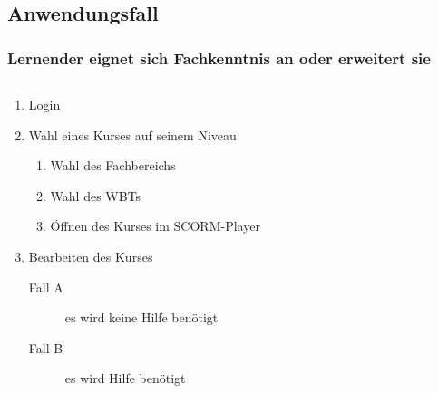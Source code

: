 \documentclass[xcolor=dvipsnames, utf8]{beamer}
\begin{document}
\subsection{Anwendungsfall}
\begin{frame}
\frametitle{Lernender eignet sich Fachkenntnis an oder erweitert sie}
\begin{columns}
\begin{column}{7cm}
\begin{enumerate}
  \item Login
  \item Wahl eines Kurses auf seinem Niveau\begin{enumerate}
    \item Wahl des Fachbereichs
    \item Wahl des WBTs
    \item Öffnen des Kurses im SCORM-Player
  \end{enumerate}
  \item Bearbeiten des Kurses\begin{description}
    \item[Fall A] es wird keine Hilfe benötigt
    \item[Fall B] es wird Hilfe benötigt
  \end{description}
\end{enumerate}
\end{column}
\begin{column}{3cm}
\end{column}
\end{columns}
\end{frame}
\end{document}
